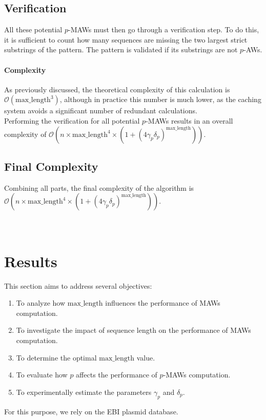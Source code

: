 \documentclass[conference]{IEEEtran}
\begin{document}
\subsection{Verification}
All these potential $p$-MAWs must then go through a verification step. To do this, it is sufficient to count how many sequences are missing the two largest strict substrings of the pattern. The pattern is validated if its substrings are not $p$-AWs.\\

\paragraph{Complexity}
As previously discussed, the theoretical complexity of this calculation is $\mathcal{O}(\text{max\_length}^3)$, although in practice this number is much lower, as the caching system avoids a significant number of redundant calculations.\\
Performing the verification for all potential $p$-MAWs results in an overall complexity of $\mathcal{O}(n \times \text{max\_length}^4 \times (1 + (4\gamma_p \delta_p)^{\text{max\_length}}))$.

\subsection{Final Complexity}
Combining all parts, the final complexity of the algorithm is $\mathcal{O}(n \times \text{max\_length}^4 \times (1 + (4\gamma_p \delta_p)^{\text{max\_length}}))$.\\\\\\


\section{Results}
This section aims to address several objectives:\\
\begin{enumerate}
\item To analyze how $\text{max\_length}$ influences the performance of MAWs computation.
\item To investigate the impact of sequence length on the performance of MAWs computation.
\item To determine the optimal $\text{max\_length}$ value.
\item To evaluate how $p$ affects the performance of $p$-MAWs computation.
\item To experimentally estimate the parameters $\gamma_p$ and $\delta_p$.
\end{enumerate}
For this purpose, we rely on the EBI plasmid database\cite{b4}.\\
\end{document}
